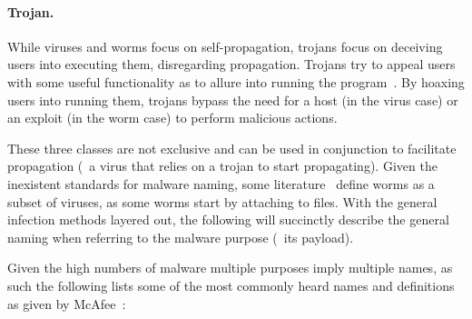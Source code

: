 \paragraph{Trojan.} While viruses and worms focus on self-propagation, trojans focus on deceiving users into executing them, disregarding propagation.
Trojans try to appeal users with some useful functionality as to allure into running the program~\cite{szor:art}.
By hoaxing users into running them, trojans bypass the need for a host (in the virus case) or an exploit (in the worm case) to perform malicious actions.

\medskip

These three classes are not exclusive and can be used in conjunction to facilitate propagation (\eg\ a virus that relies on a trojan to start propagating).
Given the inexistent standards for malware naming, some literature~\cite{szor:art} define worms as a subset of viruses, as some worms start by attaching to files.
With the general infection methods layered out, the following will succinctly describe the general naming when referring to the malware purpose (\ie\ its payload).

Given the high numbers of malware multiple purposes imply multiple names, as such the following lists some of the most commonly heard names and definitions as given by McAfee~\cite{mcafee:glossary}:

